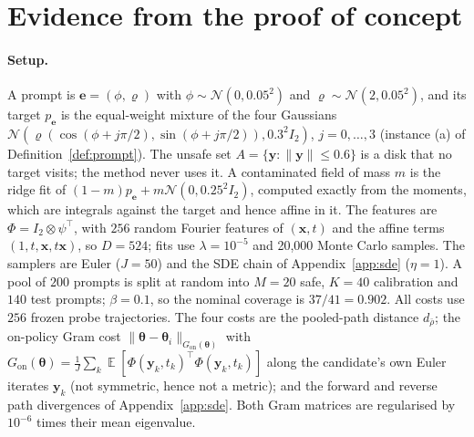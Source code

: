\documentclass{article}
\DeclareMathOperator{\E}{\mathbb{E}}
\newcommand{\cN}{\mathcal{N}}
\newcommand{\bth}{\boldsymbol{\theta}}
\newcommand{\bx}{\mathbf{x}}
\newcommand{\by}{\mathbf{y}}
\newcommand{\be}{\mathbf{e}}
\theoremstyle{plain}
\theoremstyle{remark}
\begin{document}
\section{Evidence from the proof of concept}\label{sec:evidence}

\paragraph{Setup.}
A prompt is $\be=(\phi,\varrho)$ with $\phi\sim\cN(0,0.05^2)$ and $\varrho\sim\cN(2,0.05^2)$, and its target $p_{\be}$ is the
equal-weight mixture of the four Gaussians $\cN(\varrho(\cos(\phi+j\pi/2),\sin(\phi+j\pi/2)),0.3^2I_2)$,
$j=0,\dots,3$ (instance (a) of Definition~\ref{def:prompt}). The unsafe set $A=\{\by:\|\by\|\le0.6\}$ is a
disk that no target visits; the method never uses it. A contaminated field of mass $m$ is the
ridge fit of $(1-m)p_{\be}+m\cN(0,0.25^2I_2)$, computed exactly from the moments, which are integrals
against the target and hence affine in it. The features are $\Phi=I_2\otimes\psi^\top$, with $256$ random Fourier features of $(\bx,t)$
and the affine terms $(1,t,\bx,t\bx)$, so $D=524$; fits use $\lambda=10^{-5}$ and 20,000 Monte Carlo
samples. The samplers are Euler ($J=50$) and the SDE chain of Appendix~\ref{app:sde} ($\eta=1$). A pool
of $200$ prompts is split at random into $M=20$ safe, $K=40$ calibration and $140$ test prompts;
$\beta=0.1$, so the nominal coverage is $37/41=0.902$. All costs use $256$ frozen probe trajectories.
The four costs are the pooled-path distance $d_{\bar\rho}$; the on-policy Gram cost
$\|\bth-\bth_i\|_{G_{\mathrm{on}}(\bth)}$ with $G_{\mathrm{on}}(\bth)=\frac1J\sum_k\E[\Phi(\by_k,t_k)^\top\Phi(\by_k,t_k)]$ along the
candidate's own Euler iterates $\by_k$ (not symmetric, hence not a metric); and the forward and
reverse path divergences of Appendix~\ref{app:sde}. Both Gram matrices are regularised by
$10^{-6}$ times their mean eigenvalue.
\end{document}
